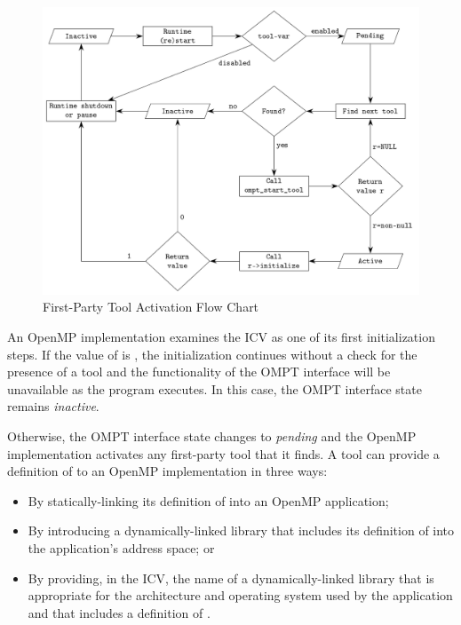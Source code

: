 \begin{figure}[h]
  \centering
  \includegraphics[width=.9\linewidth]{ompt/ompt_flow_chart.pdf}
  \caption{First-Party Tool Activation Flow Chart}
  \label{fig:ompt_diagram}
\end{figure}

An OpenMP implementation examines the  ICV as one of its first 
initialization steps. If the value of  is , the 
initialization continues without a check for the presence of a tool and 
the functionality of the OMPT interface will be unavailable as the program 
executes. In this case, the OMPT interface state remains \emph{inactive}.

Otherwise, the OMPT interface state changes to \emph{pending} and the 
OpenMP implementation activates any first-party tool that it finds. A 
tool can provide a definition of  to an OpenMP 
implementation in three ways:

\begin{itemize}
\item By statically-linking its definition of  into an
      OpenMP application;
\item By introducing a dynamically-linked library that includes its definition
      of  into the application's address space; or
\item By providing, in the  ICV, the name of a 
      dynamically-linked library that is appropriate for the architecture and 
      operating system used by the application and that includes a
      definition of .
\end{itemize}

